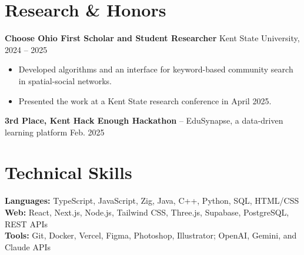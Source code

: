 \documentclass[10pt]{article}
\begin{document}
\section*{Research \& Honors}
\textbf{Choose Ohio First Scholar and Student Researcher} \hfill Kent State University, 2024 -- 2025
\begin{itemize}
  \item Developed algorithms and an interface for keyword-based community search in spatial-social networks.
  \item Presented the work at a Kent State research conference in April 2025.
\end{itemize}
\textbf{3rd Place, Kent Hack Enough Hackathon} -- EduSynapse, a data-driven learning platform \hfill Feb. 2025

\section*{Technical Skills}
\textbf{Languages:} TypeScript, JavaScript, Zig, Java, C++, Python, SQL, HTML/CSS\\
\textbf{Web:} React, Next.js, Node.js, Tailwind CSS, Three.js, Supabase, PostgreSQL, REST APIs\\
\textbf{Tools:} Git, Docker, Vercel, Figma, Photoshop, Illustrator; OpenAI, Gemini, and Claude APIs
\end{document}
